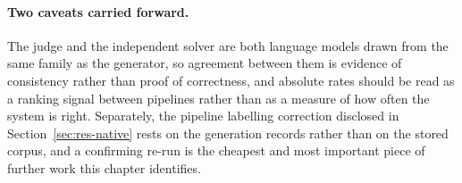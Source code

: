 \paragraph{Two caveats carried forward.} The judge and the independent solver are
both language models drawn from the same family as the generator, so agreement
between them is evidence of consistency rather than proof of correctness, and
absolute rates should be read as a ranking signal between pipelines rather than
as a measure of how often the system is right. Separately, the pipeline
labelling correction disclosed in Section~\ref{sec:res-native} rests on the
generation records rather than on the stored corpus, and a confirming re-run is
the cheapest and most important piece of further work this chapter identifies.

